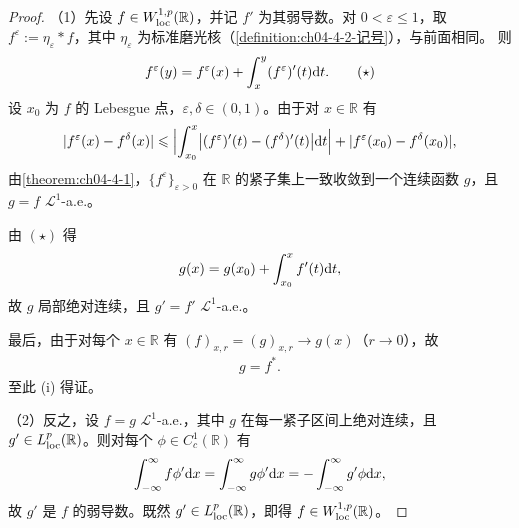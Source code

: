 ﻿\documentclass[../../main.tex]{subfiles}%
\begin{document}
\begin{proof}
（1）先设 $f\in W^{1,p}_{\mathrm{loc}}(\mathbb{R})$，并记 $f'$ 为其弱导数。对 $0<\varepsilon\leqslant1$，取 $f^{\varepsilon}:=\eta_{\varepsilon}*f$，其中 $\eta_{\varepsilon}$ 为标准磨光核（\cref{definition:ch04-4-2-记号}），与前面相同。%
则
\begin{align*}
f^{\varepsilon}(y)=f^{\varepsilon}(x)+\int_{x}^{y}(f^{\varepsilon})'(t)\mathrm{d} t .\qquad(\star)
\end{align*}
设 $x_{0}$ 为 $f$ 的 Lebesgue 点，$\varepsilon,\delta\in(0,1)$。由于对 $x\in\mathbb{R}$ 有
\begin{align*}
\lvert f^{\varepsilon}(x)-f^{\delta}(x)\rvert
\leqslant\Bigl\lvert\int_{x_{0}}^{x}\bigl\lvert(f^{\varepsilon})'(t)-(f^{\delta})'(t)\bigr\rvert\mathrm{d} t\Bigr\rvert+\lvert f^{\varepsilon}(x_{0})-f^{\delta}(x_{0})\rvert ,
\end{align*}
由\cref{theorem:ch04-4-1}，$\{f^{\varepsilon}\}_{\varepsilon>0}$ 在 $\mathbb{R}$ 的紧子集上一致收敛到一个连续函数 $g$，且 $g=f$ $\mathcal{L}^{1}$-a.e.。%

由 $(\star)$ 得
\begin{align*}
g(x)=g(x_{0})+\int_{x_{0}}^{x}f'(t)\mathrm{d} t ,
\end{align*}
故 $g$ 局部绝对连续，且 $g'=f'$ $\mathcal{L}^{1}$-a.e.。

最后，由于对每个 $x\in\mathbb{R}$ 有 $(f)_{x,r}=(g)_{x,r}\to g(x)$（$r\to0$），故
\begin{align*}
g=f^{*}.
\end{align*}
至此 (i) 得证。

（2）反之，设 $f=g$ $\mathcal{L}^{1}$-a.e.，其中 $g$ 在每一紧子区间上绝对连续，且 $g'\in L^{p}_{\mathrm{loc}}(\mathbb{R})$。则对每个 $\phi\in C^{1}_{c}(\mathbb{R})$ 有
\begin{align*}
\int_{-\infty}^{\infty}f\phi'\mathrm{d} x=\int_{-\infty}^{\infty}g\phi'\mathrm{d} x=-\int_{-\infty}^{\infty}g'\phi\mathrm{d} x ,
\end{align*}
故 $g'$ 是 $f$ 的弱导数。既然 $g'\in L^{p}_{\mathrm{loc}}(\mathbb{R})$，即得 $f\in W^{1,p}_{\mathrm{loc}}(\mathbb{R})$。
\end{proof}
\end{document}
